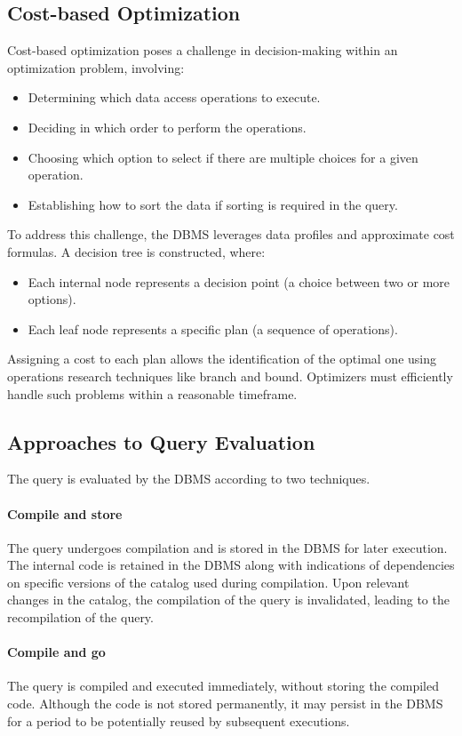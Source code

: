 \subsection{Cost-based Optimization}
Cost-based optimization poses a challenge in decision-making within an optimization problem, involving:
\begin{itemize}
        \item Determining which data access operations to execute.
        \item Deciding in which order to perform the operations.
        \item Choosing which option to select if there are multiple choices for a given operation.
        \item Establishing how to sort the data if sorting is required in the query.
\end{itemize}
To address this challenge, the DBMS leverages data profiles and approximate cost formulas. 
A decision tree is constructed, where:
\begin{itemize}
    \item Each internal node represents a decision point (a choice between two or more options).
    \item Each leaf node represents a specific plan (a sequence of operations).
\end{itemize}
Assigning a cost to each plan allows the identification of the optimal one using operations research techniques like branch and bound. 
Optimizers must efficiently handle such problems within a reasonable timeframe.

\subsection{Approaches to Query Evaluation}
The query is evaluated by the DBMS according to two techniques. 

\paragraph*{Compile and store}
The query undergoes compilation and is stored in the DBMS for later execution.
The internal code is retained in the DBMS along with indications of dependencies on specific versions of the catalog used during compilation.
Upon relevant changes in the catalog, the compilation of the query is invalidated, leading to the recompilation of the query.

\paragraph*{Compile and go}
The query is compiled and executed immediately, without storing the compiled code.
Although the code is not stored permanently, it may persist in the DBMS for a period to be potentially reused by subsequent executions.
